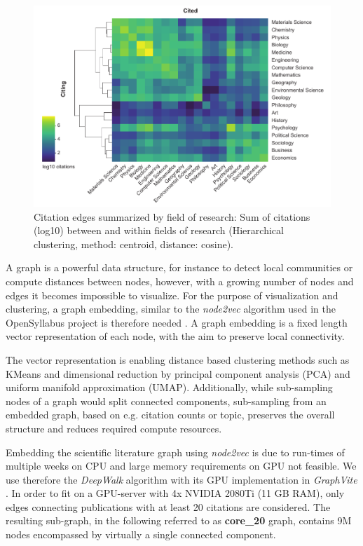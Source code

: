\begin{figure}[h]
	\centering
	\includegraphics[width=1.0\textwidth]{figures/state_of_art/field_interactions.pdf}
	\captionsetup{format=plain}
	\caption[Scientific field interactions]{Citation edges summarized by field of research: Sum of citations (log10) between and within fields of research (Hierarchical clustering, method: centroid, distance: cosine).}
	\label{fig:state_of_art:field_interactions}
\end{figure}

A graph is a powerful data structure, for instance to detect local communities or compute distances between nodes, however, with a growing number of nodes and edges it becomes impossible to visualize.
For the purpose of visualization and clustering, a graph embedding, similar to the \textit{node2vec} algorithm used in the OpenSyllabus project is therefore needed \cite{Grover2016}.
A graph embedding is a fixed length vector representation of each node, with the aim to preserve local connectivity.

The vector representation is enabling distance based clustering methods such as KMeans and dimensional reduction by principal component analysis (PCA) and uniform manifold approximation (UMAP).
Additionally, while sub-sampling nodes of a graph would split connected components, sub-sampling from an embedded graph, based on e.g. citation counts or topic, preserves the overall structure and reduces required compute resources.

Embedding the scientific literature graph using \textit{node2vec} is due to run-times of multiple weeks on CPU and large memory requirements on GPU not feasible.
We use therefore the \textit{DeepWalk} \cite{Perozzi2014} algorithm with its GPU implementation in \textit{GraphVite} \cite{Zhu2019}.
In order to fit on a GPU-server with 4x NVIDIA 2080Ti (11 GB RAM), only edges connecting publications with at least 20 citations are considered.
The resulting sub-graph, in the following referred to as \textbf{core\_20} graph, contains 9M nodes encompassed by virtually a single connected component.

